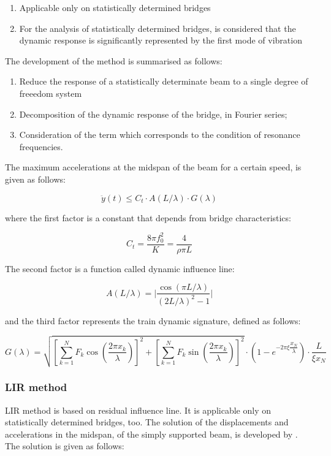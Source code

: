 \begin{enumerate} [-]
	\item Applicable only on statistically determined bridges
	\item For the analysis of statistically determined bridges, is considered that the dynamic response is significantly represented by the first mode of vibration
\end{enumerate}

The development of the method is summarised as follows:

\begin{enumerate}
	\item Reduce the response of a statistically determinate beam to a single degree of freeedom system
	\item Decomposition of the dynamic response of the bridge, in Fourier series;
	\item Consideration of the term which corresponds to the condition of resonance frequencies.
\end{enumerate}

The maximum accelerations at the midspan of the beam for a certain speed, is given as follows:

\begin{equation}
	\ddot{y}(t)\leq C_t\cdot A(L/\lambda)\cdot G(\lambda)
\end{equation}

where the first factor is a constant that depends from bridge characteristics:

\begin{equation}
	C_t=\dfrac{8\pi f_0^2}{K}=\dfrac{4}{\rho\pi L}  
\end{equation}

The second factor is a function called dynamic influence line:

\begin{equation}
	A(L/\lambda )= \bigg\vert\dfrac{\cos (\pi L/\lambda)}{(2L/\lambda)^2-1} \bigg\vert
\end{equation}

and the third factor represents the train dynamic signature, defined as follows:

\begin{equation}
	G(\lambda)=\sqrt{[\sum_{k=1}^N F_k\cos(\dfrac{2\pi x_k}{\lambda})]^2+[\sum_{k=1}^N F_k \sin(\dfrac{2\pi x_k}{\lambda})]^2}\cdot (1-e^{-2\pi \xi \dfrac{x_N}{\lambda}})\cdot \dfrac{L}{\xi x_N}
\end{equation}

\subsubsection{LIR method}
LIR method is based on residual influence line. It is applicable only on statistically determined bridges, too. The solution of the displacements and accelerations in the midspan, of the simply supported beam, is developed by \citeauthor{dominguez2001dinamica}. The solution is given as follows:

